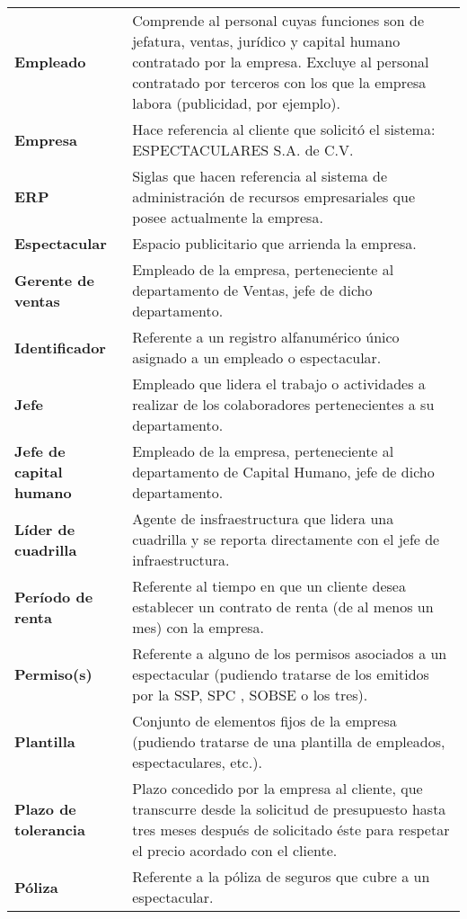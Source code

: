\begin{longtable}[H]{m{4cm}m{8cm}}
\textbf{Empleado} &  Comprende al personal cuyas funciones son de jefatura, ventas, jurídico y capital humano contratado por la empresa. Excluye al personal contratado por terceros con los que la empresa labora (publicidad, por ejemplo).\tabularnewline

\textbf{Empresa} & Hace referencia al cliente que solicitó el sistema: ESPECTACULARES S.A. de C.V.\tabularnewline

\textbf{ERP} & Siglas que hacen referencia al sistema de administración de recursos empresariales que posee actualmente la empresa. \tabularnewline

\textbf{Espectacular} & Espacio publicitario que arrienda la empresa. \tabularnewline

\textbf{Gerente de ventas} & Empleado de la empresa, perteneciente al departamento de Ventas, jefe de dicho departamento. \tabularnewline

\textbf{Identificador} & Referente a un registro alfanumérico único asignado a un empleado o espectacular. \tabularnewline

\textbf{Jefe} & Empleado que lidera el trabajo o actividades a realizar de los colaboradores pertenecientes a su departamento. \tabularnewline

\textbf{Jefe de capital humano} & Empleado de la empresa, perteneciente al departamento de Capital Humano, jefe de dicho departamento. \tabularnewline

\textbf{Líder de cuadrilla} & Agente de insfraestructura que lidera una cuadrilla y se reporta directamente con el jefe de infraestructura. \tabularnewline

\textbf{Período de renta} & Referente al tiempo en que un cliente desea establecer un contrato de renta (de al menos un mes) con la empresa. \tabularnewline

\textbf{Permiso(s)} & Referente a alguno de los permisos asociados a un espectacular (pudiendo tratarse de los emitidos por la SSP, SPC , SOBSE o los tres). \tabularnewline

\textbf{Plantilla} & Conjunto de elementos fijos de la empresa (pudiendo tratarse de una plantilla de empleados, espectaculares, etc.). \tabularnewline

\textbf{Plazo de tolerancia} & Plazo concedido por la empresa al cliente, que transcurre desde la solicitud de presupuesto hasta tres meses después de solicitado éste para respetar el precio acordado con el cliente.\tabularnewline

\textbf{Póliza} & Referente a la póliza de seguros que cubre a un espectacular. \tabularnewline


\end{longtable}
